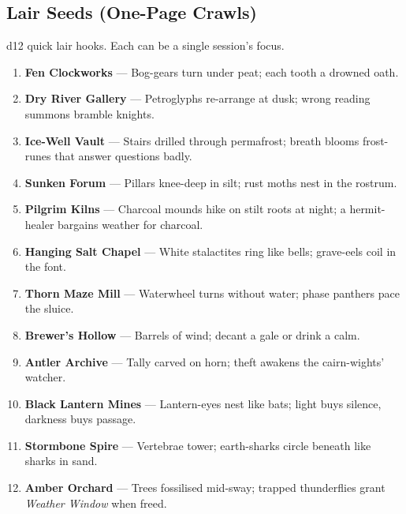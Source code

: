 \subsection*{Lair Seeds (One-Page Crawls)}
\label{sec:wilderness-lair-seeds}
d12 quick lair hooks. Each can be a single session's focus.
\begin{enumerate}
  \item \textbf{Fen Clockworks} --- Bog-gears turn under peat; each tooth a drowned oath.
  \item \textbf{Dry River Gallery} --- Petroglyphs re-arrange at dusk; wrong reading summons bramble knights.
  \item \textbf{Ice-Well Vault} --- Stairs drilled through permafrost; breath blooms frost-runes that answer questions badly.
  \item \textbf{Sunken Forum} --- Pillars knee-deep in silt; rust moths nest in the rostrum.
  \item \textbf{Pilgrim Kilns} --- Charcoal mounds hike on stilt roots at night; a hermit-healer bargains weather for charcoal.
  \item \textbf{Hanging Salt Chapel} --- White stalactites ring like bells; grave-eels coil in the font.
  \item \textbf{Thorn Maze Mill} --- Waterwheel turns without water; phase panthers pace the sluice.
  \item \textbf{Brewer's Hollow} --- Barrels of wind; decant a gale or drink a calm.
  \item \textbf{Antler Archive} --- Tally carved on horn; theft awakens the cairn-wights' watcher.
  \item \textbf{Black Lantern Mines} --- Lantern-eyes nest like bats; light buys silence, darkness buys passage.
  \item \textbf{Stormbone Spire} --- Vertebrae tower; earth-sharks circle beneath like sharks in sand.
  \item \textbf{Amber Orchard} --- Trees fossilised mid-sway; trapped thunderflies grant \emph{Weather Window} when freed.
\end{enumerate}

